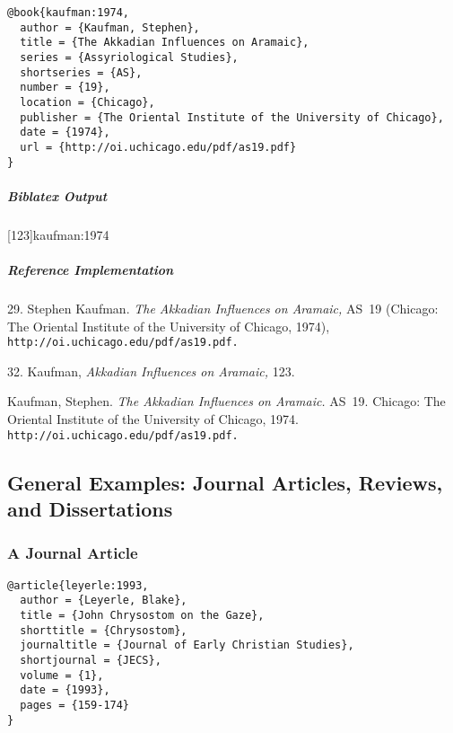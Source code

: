 \documentclass[a4paper]{article}
\newenvironment{biboutput}{%
  \subparagraph{Biblatex Output}
}{\color{black}}
\newenvironment{refimp}{%
  \subparagraph{Reference Implementation}
  \color{reference-colour}
  \rm
}{\par\color{black}}
\begin{document}
\begin{lstlisting}
@book{kaufman:1974,
  author = {Kaufman, Stephen},
  title = {The Akkadian Influences on Aramaic},
  series = {Assyriological Studies},
  shortseries = {AS},
  number = {19},
  location = {Chicago},
  publisher = {The Oriental Institute of the University of Chicago},
  date = {1974},
  url = {http://oi.uchicago.edu/pdf/as19.pdf}
}
\end{lstlisting}

\begin{biboutput}
  [123]{kaufman:1974}
\end{biboutput}

\begin{refimp}
  \hspace*{\bibindent}29. Stephen Kaufman. \emph{The Akkadian Influences on
  Aramaic,} AS~19 (Chicago: The Oriental Institute of the University of
  Chicago, 1974), \nolinkurl{http://oi.uchicago.edu/pdf/as19.pdf.}

  \hspace*{\bibindent}32. Kaufman, \emph{Akkadian Influences on Aramaic,} 123.

  \hangindent\bibindent Kaufman, Stephen. \emph{The Akkadian Influences on
  Aramaic.} AS~19. Chicago: The Oriental Institute of the University of
  Chicago, 1974. \nolinkurl{http://oi.uchicago.edu/pdf/as19.pdf.}

\end{refimp}

\subsection{General Examples: Journal Articles, Reviews, and Dissertations}

\subsubsection{A Journal Article}

\begin{lstlisting}
@article{leyerle:1993,
  author = {Leyerle, Blake},
  title = {John Chrysostom on the Gaze},
  shorttitle = {Chrysostom},
  journaltitle = {Journal of Early Christian Studies},
  shortjournal = {JECS},
  volume = {1},
  date = {1993},
  pages = {159-174}
}
\end{lstlisting}  
\end{document}
